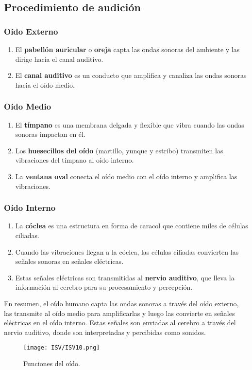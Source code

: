 \documentclass[
	12pt, %
	fleqn, %
	a4paper, %
	oneside, %
]{LegrandOrangeBook}
\begin{document}
\subsection{Procedimiento de audición}
\subsubsection*{Oído Externo}
\begin{enumerate}
  \item El \textbf{pabellón auricular} o \textbf{oreja} capta las ondas sonoras del ambiente y las dirige hacia el canal auditivo.
  \item El \textbf{canal auditivo} es un conducto que amplifica y canaliza las ondas sonoras hacia el oído medio.
\end{enumerate}

\subsubsection*{Oído Medio}
\begin{enumerate}
  \item El \textbf{tímpano} es una membrana delgada y flexible que vibra cuando las ondas sonoras impactan en él.
  \item Los \textbf{huesecillos del oído} (martillo, yunque y estribo) transmiten las vibraciones del tímpano al oído interno.
  \item La \textbf{ventana oval} conecta el oído medio con el oído interno y amplifica las vibraciones.
\end{enumerate}

\subsubsection*{Oído Interno}
\begin{enumerate}
  \item La \textbf{cóclea} es una estructura en forma de caracol que contiene miles de células ciliadas.
  \item Cuando las vibraciones llegan a la cóclea, las células ciliadas convierten las señales sonoras en señales eléctricas.
  \item Estas señales eléctricas son transmitidas al \textbf{nervio auditivo}, que lleva la información al cerebro para su procesamiento y percepción.
\end{enumerate}

En resumen, el oído humano capta las ondas sonoras a través del oído externo, las transmite al oído medio para amplificarlas y luego las convierte en señales eléctricas en el oído interno. Estas señales son enviadas al cerebro a través del nervio auditivo, donde son interpretadas y percibidas como sonidos.
\begin{figure}[H]
\centering
\texttt{[image: ISV/ISV10.png]}
\caption{Funciones del oído.}
\end{figure}
\end{document}

